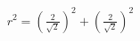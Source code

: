 \documentclass[preview]{standalone}
\begin{document}
\begin{align*}
r^2 = \left(\frac{2}{\sqrt{2}}\right)^2 + \left(\frac{2}{\sqrt{2}}\right)^2
\end{align*}
\end{document}
